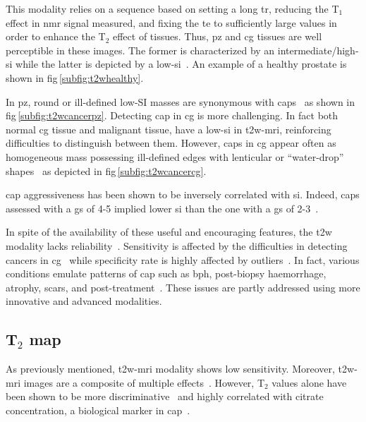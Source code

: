 This modality relies on a sequence based on setting a long \ac{tr}, reducing the T$_{1}$ effect in \ac{nmr} signal measured, and fixing the \ac{te} to sufficiently large values in order to enhance the T$_{2}$ effect of tissues.
Thus, \ac{pz} and \ac{cg} tissues are well perceptible in these images.
The former is characterized by an intermediate/high-\ac{si} while the latter is depicted by a low-\ac{si}~\cite{Hricak1987}.
An example of a healthy prostate is shown in \acs{fig}\,\ref{subfig:t2whealthy}.

In \ac{pz}, round or ill-defined low-SI masses are synonymous with \acp{cap}~\cite{Hricak1983} as shown in \acs{fig}\,\ref{subfig:t2wcancerpz}.
Detecting \ac{cap} in \ac{cg} is more challenging.
In fact both normal \ac{cg} tissue and malignant tissue, have a low-\ac{si} in \ac{t2w}-\ac{mri}, reinforcing difficulties to distinguish between them.
However, \acp{cap} in \ac{cg} appear often as homogeneous mass possessing ill-defined edges with lenticular or ``water-drop'' shapes~\cite{Akin2006,Barentsz2012} as depicted in \acs{fig}\,\ref{subfig:t2wcancercg}. 

\ac{cap} aggressiveness has been shown to be inversely correlated with \ac{si}.
Indeed, \acp{cap} assessed with a \ac{gs} of 4-5 implied lower \ac{si} than the one with a \ac{gs} of 2-3~\cite{Wang2008}.

In spite of the availability of these useful and encouraging features, the \ac{t2w} modality lacks reliability~\cite{Kirkham2006,Hoeks2011}.
Sensitivity is affected by the difficulties in detecting cancers in \ac{cg}~\cite{Kirkham2006} while specificity rate is highly affected by outliers~\cite{Barentsz2012}.
In fact, various conditions emulate patterns of \ac{cap} such as \ac{bph}, post-biopsy haemorrhage, atrophy, scars, and post-treatment~\cite{Hricak1987,Quint1991,Scheidler1999,Cruz2002,Barentsz2012}.
These issues are partly addressed using more innovative and advanced modalities.

\subsection{T$_2$ map} \label{subsec:chp2:imaging:t2}
As previously mentioned, \ac{t2w}-\ac{mri} modality shows low sensitivity.
Moreover, \ac{t2w}-\ac{mri} images are a composite of multiple effects~\cite{Hegde2013}.
However, T$_2$ values alone have been shown to be more discriminative~\cite{Liu2011} and highly correlated with citrate concentration, a biological marker in \ac{cap}~\cite{Liney1996,Liney1997}.


